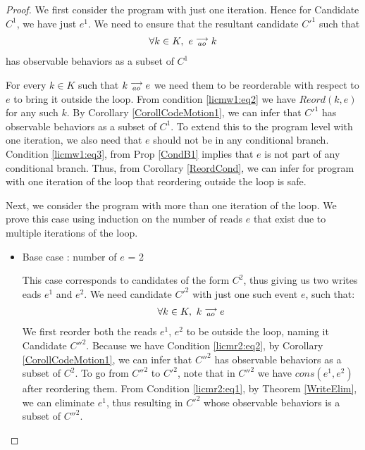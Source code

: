\begin{proof}


    We first consider the program with just one iteration. Hence for Candidate $C^1$, we have just $e^1$. 
    We need to ensure that the resultant candidate $C'^1$ such that 
    \begin{align*}
        \forall k \in K, \ e\stackrel{\longrightarrow}{_{ao}}k
    \end{align*}  
    has observable behaviors as a subset of $C^1$

    For every $k \in K$ such that $k\stackrel{\longrightarrow}{_{ao}}e$ we need them to be reorderable with respect to $e$ to bring it outside the loop.
    From condition \ref{licmw1:eq2} we have $Reord(k,e)$ for any such $k$.
    By Corollary \ref{CorollCodeMotion1}, we can infer that $C'^1$ has observable behaviors as a subset of $C^1$.
    To extend this to the program level with one iteration, we also need that $e$ should not be in any conditional branch.
    Condition \ref{licmw1:eq3}, from Prop \ref{CondB1} implies that $e$ is not part of any conditional branch.
    Thus, from Corollary \ref{ReordCond}, we can infer for program with one iteration of the loop that reordering outside the loop is safe. 
    
    Next, we consider the program with more than one iteration of the loop. 
    We prove this case using induction on the number of reads $e$ that exist due to multiple iterations of the loop. 


    \begin{itemize}

        \item Base case : number of $e$ = 2
    
        This case corresponds to candidates of the form $C^2$, thus giving us two writes eads $e^1$ and $e^2$.
        We need candidate $C'^2$ with just one such event $e$, such that:
        \begin{align*}
            \forall k \in K, \ k\stackrel{\longrightarrow}{_{ao}}e
        \end{align*}  
        We first reorder both the reads $e^1$, $e^2$ to be outside the loop, naming it Candidate $C''^2$.
        Because we have Condition \ref{licmr2:eq2}, by Corollary \ref{CorollCodeMotion1}, we can infer that $C''^2$ has observable behaviors as a subset of $C^2$.
        To go from $C''^2$ to $C'^2$, note that in $C''^2$ we have $cons(e^1, e^2)$ after reordering them. 
        From Condition \ref{licmr2:eq1}, by Theorem \ref{WriteElim}, we can eliminate $e^1$, thus resulting in $C'^2$ whose observable behaviors is a subset of $C''^2$\footnotemark.


\end{itemize}
\end{proof}
